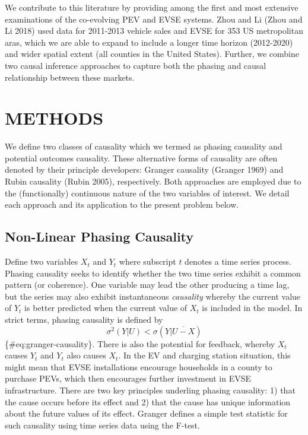 \documentclass[
  letterpaper,
  DIV=11,
  numbers=noendperiod]{scrartcl}
\begin{document}
We contribute to this literature by providing among the first and most
extensive examinations of the co-evolving PEV and EVSE systems. Zhou and
Li (Zhou and Li 2018) used data for 2011-2013 vehicle sales and EVSE for
353 US metropolitan aras, which we are able to expand to include a
longer time horizon (2012-2020) and wider spatial extent (all counties
in the United States). Further, we combine two causal inference
approaches to capture both the phasing and causal relationship between
these markets.

\hypertarget{methods}{%
\section{METHODS}\label{methods}}

We define two classes of causality which we termed as phasing causality
and potential outcomes causality. These alternative forms of causality
are often denoted by their principle developers: Granger causality
(Granger 1969) and Rubin causality (Rubin 2005), respectively. Both
approaches are employed due to the (functionally) continuous nature of
the two variables of interest. We detail each approach and its
application to the present problem below.

\hypertarget{non-linear-phasing-causality}{%
\subsection{Non-Linear Phasing
Causality}\label{non-linear-phasing-causality}}

Define two variables \(X_t\) and \(Y_t\) where subscript \(t\) denotes a
time series process. Phasing causality seeks to identify whether the two
time series exhibit a common pattern (or coherence). One variable may
lead the other producing a time lag, but the series may also exhibit
instantaneous \emph{causality} whereby the current value of \(Y_t\) is
better predicted when the current value of \(X_t\) is included in the
model. In strict terms, phasing causality is defined by
\[\sigma^2(Y|U)<\sigma(Y|\overline{U-X})\] \{\#eq:granger-causality\}.
There is also the potential for feedback, whereby \(X_t\) causes \(Y_t\)
and \(Y_t\) also causes \(X_t\). In the EV and charging station
situation, this might mean that EVSE installations encourage households
in a county to purchase PEVs, which then encourages further investment
in EVSE infrastructure. There are two key principles underling phasing
causality: 1) that the cause occurs before its effect and 2) that the
cause has unique information about the future values of its effect.
Granger defines a simple test statistic for such causality using time
series data using the F-test.
\end{document}
